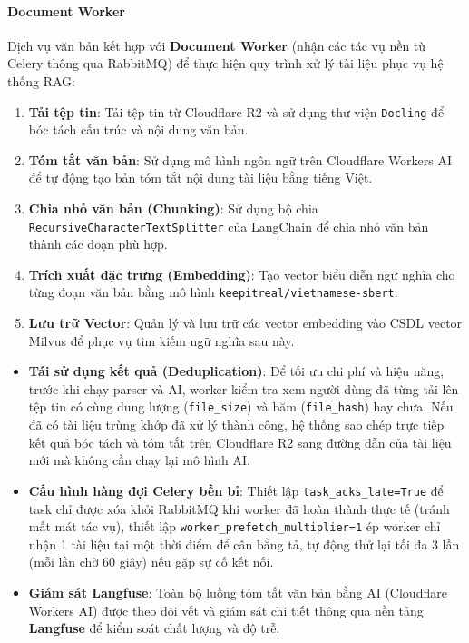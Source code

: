 \paragraph{Document Worker}

Dịch vụ văn bản kết hợp với \textbf{Document Worker} (nhận các tác vụ nền từ Celery thông qua RabbitMQ) để thực hiện quy trình xử lý tài liệu phục vụ hệ thống RAG:

\begin{enumerate}
\item \textbf{Tải tệp tin}: Tải tệp tin từ Cloudflare R2 và sử dụng thư viện \texttt{Docling} để bóc tách cấu trúc và nội dung văn bản.
\item \textbf{Tóm tắt văn bản}: Sử dụng mô hình ngôn ngữ trên Cloudflare Workers AI để tự động tạo bản tóm tắt nội dung tài liệu bằng tiếng Việt.
\item \textbf{Chia nhỏ văn bản (Chunking)}: Sử dụng bộ chia \texttt{RecursiveCharacterTextSplitter} của LangChain để chia nhỏ văn bản thành các đoạn phù hợp.
\item \textbf{Trích xuất đặc trưng (Embedding)}: Tạo vector biểu diễn ngữ nghĩa cho từng đoạn văn bản bằng mô hình \texttt{keepitreal/vietnamese-sbert}.
\item \textbf{Lưu trữ Vector}: Quản lý và lưu trữ các vector embedding vào CSDL vector Milvus để phục vụ tìm kiếm ngữ nghĩa sau này.
\end{enumerate}


\begin{itemize}
\item \textbf{Tái sử dụng kết quả (Deduplication)}: Để tối ưu chi phí và hiệu năng, trước khi chạy parser và AI, worker kiểm tra xem người dùng đã từng tải lên tệp tin có cùng dung lượng (\texttt{file\_size}) và băm (\texttt{file\_hash}) hay chưa. Nếu đã có tài liệu trùng khớp đã xử lý thành công, hệ thống sao chép trực tiếp kết quả bóc tách và tóm tắt trên Cloudflare R2 sang đường dẫn của tài liệu mới mà không cần chạy lại mô hình AI.

\item \textbf{Cấu hình hàng đợi Celery bền bỉ}: Thiết lập \texttt{task\_acks\_late=True} để task chỉ được xóa khỏi RabbitMQ khi worker đã hoàn thành thực tế (tránh mất mát tác vụ), thiết lập \texttt{worker\_prefetch\_multiplier=1} ép worker chỉ nhận 1 tài liệu tại một thời điểm để cân bằng tả, tự động thử lại tối đa 3 lần (mỗi lần chờ 60 giây) nếu gặp sự cố kết nối.

\item \textbf{Giám sát Langfuse}: Toàn bộ luồng tóm tắt văn bản bằng AI (Cloudflare Workers AI) được theo dõi vết và giám sát chi tiết thông qua nền tảng \textbf{Langfuse} để kiểm soát chất lượng và độ trễ.
\end{itemize}

